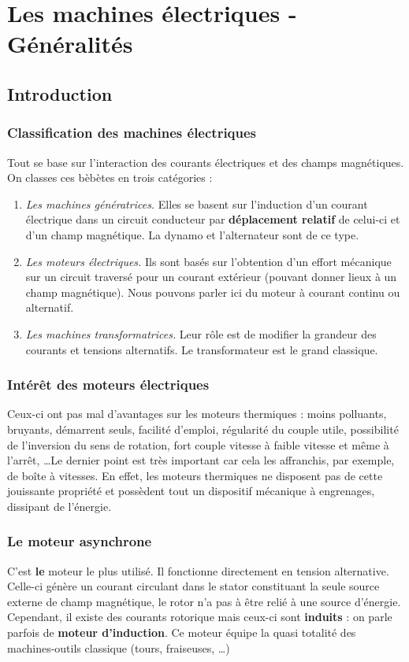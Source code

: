 \chapter{Les machines électriques - Généralités}
\section{Introduction}
	\subsection{Classification des machines électriques}
	Tout se base sur l'interaction des courants électriques et des champs 
	magnétiques. On classes ces bèbètes en trois catégories :
	
	\begin{enumerate}
	\item \textit{Les machines génératrices.} Elles se basent 
	sur l'induction d'un courant électrique dans un circuit conducteur par
	\textbf{déplacement relatif} de celui-ci et d'un champ magnétique. La 
	dynamo et l'alternateur sont de ce type.
	\item \textit{Les moteurs électriques.} Ils sont basés sur 
	l'obtention d'un effort mécanique sur un circuit traversé pour un 
	courant extérieur (pouvant donner lieux à un champ magnétique). Nous 
	pouvons parler ici du moteur à courant continu ou alternatif.
	\item \textit{Les machines transformatrices.} Leur rôle est 
	de modifier la grandeur des courants et tensions alternatifs. Le 
	transformateur est le grand classique.
	\end{enumerate}
	
	\subsection{Intérêt des moteurs électriques}
	Ceux-ci ont pas mal d'avantages sur les moteurs thermiques : moins 
	polluants, bruyants, démarrent seuls, facilité d'emploi, régularité 
	du couple utile, possibilité de l'inversion du sens de rotation, 
	fort couple vitesse à faible vitesse et même à l'arrêt, \dots Le 
	dernier point est très important car cela les affranchis, par 
	exemple, de boîte à vitesses. En effet, les moteurs thermiques ne 
	disposent pas de cette jouissante propriété et possèdent tout un 
	dispositif mécanique à engrenages, dissipant de l'énergie.
	
	\subsection{Le moteur asynchrone}
	C'est \textbf{le} moteur le plus utilisé. Il fonctionne directement 
	en tension alternative. Celle-ci génère un courant circulant dans le 
	stator constituant la seule source externe de champ magnétique, le 
	rotor n'a pas à être relié à une source d'énergie. Cependant, il existe 
	des courants rotorique mais ceux-ci sont \textbf{induits} : on parle 
	parfois de \textbf{moteur d'induction}. Ce moteur équipe la quasi 
	totalité des machines-outils classique (tours, fraiseuses, \dots)
	
